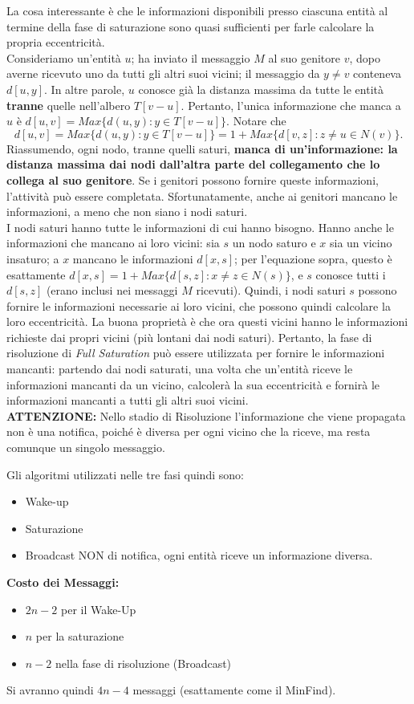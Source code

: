 La cosa interessante è che le informazioni disponibili presso ciascuna entità al
termine della fase di saturazione sono quasi sufficienti per farle calcolare la
propria eccentricità.\\
Consideriamo un'entità $u$; ha inviato il messaggio $M$ al suo genitore $v$,
dopo averne ricevuto uno da tutti gli altri suoi vicini; il messaggio da $y \neq
    v$ conteneva $d[u, y]$. In altre parole, $u$ conosce già la distanza massima da
tutte le entità \textbf{tranne} quelle nell'albero $T[v - u]$. Pertanto, l'unica
informazione che manca a $u$ è $d[u, v] = Max\{d(u, y) : y \in T[v - u]\}$.
Notare che
$$
    d[u, v] = Max\{d(u, y) : y \in T [v - u]\} = 1 + Max\{d[v, z] : z \neq u \in N (v)\}.
$$
Riassumendo, ogni nodo, tranne quelli saturi, \textbf{manca di un'informazione:
    la distanza massima dai nodi dall'altra parte del collegamento che lo collega al
    suo genitore}. Se i genitori possono fornire queste informazioni, l'attività può
essere completata. Sfortunatamente, anche ai genitori mancano le informazioni, a
meno che non siano i nodi saturi.\\
I nodi saturi hanno tutte le informazioni di cui hanno bisogno. Hanno anche le
informazioni che mancano ai loro vicini: sia $s$ un nodo saturo e $x$ sia un
vicino insaturo; a $x$ mancano le informazioni $d[x, s]$; per l'equazione sopra,
questo è esattamente $d[x, s] = 1 + Max\{d[s, z] : x \neq z \in N(s)\}$, e $s$
conosce tutti i $d[s, z]$ (erano inclusi nei messaggi $M$ ricevuti). Quindi, i
nodi saturi $s$ possono fornire le informazioni necessarie ai loro vicini, che
possono quindi calcolare la loro eccentricità. La buona proprietà è che ora
questi vicini hanno le informazioni richieste dai propri vicini (più lontani dai
nodi saturi). Pertanto, la fase di risoluzione di \textit{Full Saturation} può
essere utilizzata per fornire le informazioni mancanti: partendo dai nodi
saturati, una volta che un'entità riceve le informazioni mancanti da un vicino,
calcolerà la sua eccentricità e fornirà le informazioni mancanti a tutti gli
altri suoi vicini.\\

\textbf{ATTENZIONE:} Nello stadio di Risoluzione l'informazione che viene
propagata non è una notifica, poiché è diversa per ogni vicino che la riceve, ma
resta comunque un singolo messaggio.

Gli algoritmi utilizzati nelle tre fasi quindi sono:
\begin{itemize}
    \item Wake-up
    \item Saturazione
    \item Broadcast NON di notifica, ogni entità riceve un informazione diversa.
\end{itemize}
\textbf{Costo dei Messaggi:}
\begin{itemize}
    \item $2n-2$ per il Wake-Up
    \item $n$ per la saturazione
    \item $n-2$ nella fase di risoluzione (Broadcast)
\end{itemize}
Si avranno quindi $4n-4$ messaggi (esattamente come il MinFind).


